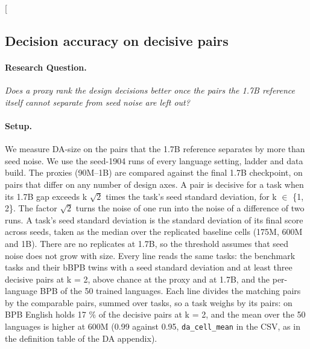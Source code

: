 \clearpage
\twocolumn[{%
\rqparent
\subsection{Decision accuracy on decisive pairs}
\label{app:rq02_decisive_pairs}

\noindent\begin{minipage}[t]{0.485\textwidth}
\vspace{0pt}
\paragraph{Research Question.} \emph{Does a proxy rank the design decisions better once the pairs the 1.7B reference itself cannot separate from seed noise are left out?}

\paragraph{Setup.} We measure DA-size on the pairs that the 1.7B reference separates by more than seed noise. We use the seed-1904 runs of every language setting, ladder and data build. The proxies (90M--1B) are compared against the final 1.7B checkpoint, on pairs that differ on any number of design axes. A pair is decisive for a task when its 1.7B gap exceeds k $\sqrt{2}$ times the task's seed standard deviation, for k $\in$ \{1, 2\}. The factor $\sqrt{2}$ turns the noise of one run into the noise of a difference of two runs. A task's seed standard deviation is the standard deviation of its final score across seeds, taken as the median over the replicated baseline cells (175M, 600M and 1B). There are no replicates at 1.7B, so the threshold assumes that seed noise does not grow with size. Every line reads the same tasks: the benchmark tasks and their bBPB twins with a seed standard deviation and at least three decisive pairs at k = 2, above chance at the proxy and at 1.7B, and the per-language BPB of the 50 trained languages. Each line divides the matching pairs by the comparable pairs, summed over tasks, so a task weighs by its pairs: on BPB English holds 17 \% of the decisive pairs at k = 2, and the mean over the 50 languages is higher at 600M (0.99 against 0.95, \texttt{da\_cell\_mean} in the CSV, as in the definition table of the DA appendix).
\end{minipage}\hfill
\begin{minipage}[t]{0.485\textwidth}
\vspace{0pt}
\begin{rqfinding}

\end{rqfinding}
\end{minipage}}

